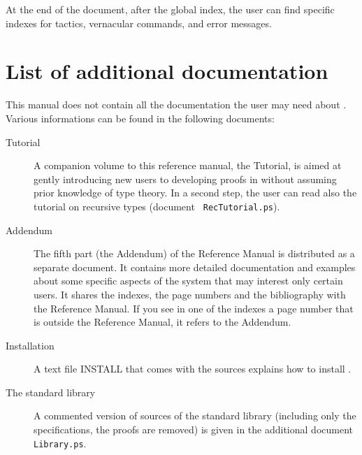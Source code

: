 At the end of the document, after the global index, the user can find
specific indexes for tactics, vernacular commands, and error
messages. 

\section*{List of additional documentation}

This manual does not contain all the documentation the user may need
about \Coq{}. Various informations can be found in the following
documents:  
\begin{description}

\item[Tutorial] 
  A companion volume to this reference manual, the \Coq{} Tutorial, is
  aimed at gently introducing new users to developing proofs in \Coq{}
  without assuming prior knowledge of type theory. In a second step, the
  user can read also the tutorial on recursive types (document {\tt
    RecTutorial.ps}).

\item[Addendum] The fifth part (the Addendum) of the Reference Manual
  is distributed as a separate document. It contains more
  detailed documentation and examples about some specific aspects of the
  system that may interest only certain users. It shares the indexes,
  the page numbers and
  the bibliography with the Reference Manual. If you see in one of the
  indexes a page number that is outside the Reference Manual, it refers
  to the Addendum. 

\item[Installation] A text file INSTALL that comes with the sources
  explains how to install \Coq{}.

\item[The \Coq{} standard library]
A commented version of sources of the \Coq{} standard library
(including only the specifications, the proofs are removed) 
is given in the additional document {\tt Library.ps}.

\end{description}



